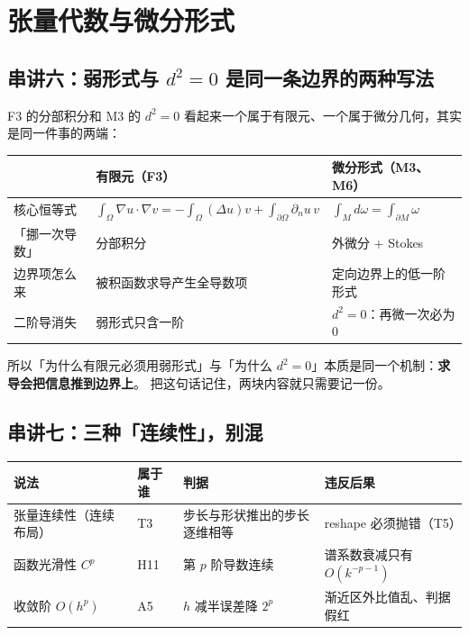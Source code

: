 \section{张量代数与微分形式}

\subsection*{串讲六：弱形式与 $d^{2}=0$ 是同一条边界的两种写法}

F3 的分部积分和 M3 的 $d^{2}=0$ 看起来一个属于有限元、一个属于微分几何，其实是同一件事的两端：

\begin{center}
\begin{tabular}{L{2.4cm}L{5.0cm}L{6.4cm}}
\toprule
 & 有限元（F3） & 微分形式（M3、M6） \\
\midrule
核心恒等式 & $\int_\Omega\nabla u\cdot\nabla v=-\int_\Omega(\Delta u)v+\int_{\partial\Omega}\partial_nu\,v$ & $\int_M d\omega=\int_{\partial M}\omega$ \\
「挪一次导数」 & 分部积分 & 外微分 + Stokes \\
边界项怎么来 & 被积函数求导产生全导数项 & 定向边界上的低一阶形式 \\
二阶导消失 & 弱形式只含一阶 & $d^{2}=0$：再微一次必为 0 \\
\bottomrule
\end{tabular}
\end{center}

所以「为什么有限元必须用弱形式」与「为什么 $d^{2}=0$」本质是同一个机制：\textbf{求导会把信息推到边界上}。
把这句话记住，两块内容就只需要记一份。

\subsection*{串讲七：三种「连续性」，别混}

\begin{center}
\begin{tabular}{L{2.6cm}L{3.6cm}L{3.4cm}L{3.0cm}}
\toprule
说法 & 属于谁 & 判据 & 违反后果 \\
\midrule
张量连续性（连续布局） & T3 & 步长与形状推出的步长逐维相等 & reshape 必须抛错（T5） \\
函数光滑性 $C^{p}$ & H11 & 第 $p$ 阶导数连续 & 谱系数衰减只有 $O(k^{-p-1})$ \\
收敛阶 $O(h^{p})$ & A5 & $h$ 减半误差降 $2^{p}$ & 渐近区外比值乱、判据假红 \\
\bottomrule
\end{tabular}
\end{center}

